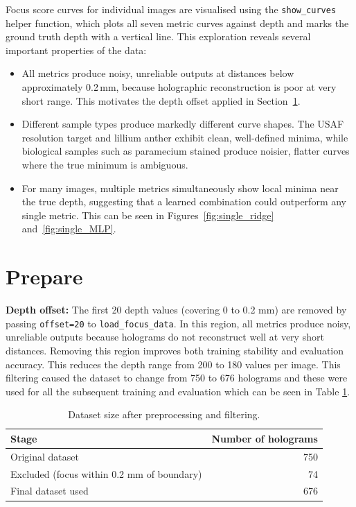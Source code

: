 \documentclass{article}
\begin{document}
Focus score curves for individual images are visualised using the \texttt{show\_curves} helper function,\cite{Helpers} which plots all seven metric curves against depth and marks the ground truth depth with a vertical line. This exploration reveals several important properties of the data:

\begin{itemize}
    \item All metrics produce noisy, unreliable outputs at distances below approximately 0.2\,mm, because holographic reconstruction is poor at very short range. This motivates the depth offset applied in Section~\ref{prepare}.
    \item Different sample types produce markedly different curve shapes. The USAF resolution target and lillium anther exhibit clean, well-defined minima, while biological samples such as paramecium stained produce noisier, flatter curves where the true minimum is ambiguous.
    \item For many images, multiple metrics simultaneously show local minima near the true depth, suggesting that a learned combination could outperform any single metric. This can be seen in Figures~\ref{fig:single_ridge} and~\ref{fig:single_MLP}.
\end{itemize}

\section{Prepare} \label{prepare}

\textbf{Depth offset:} The first 20 depth values (covering 0 to 0.2 mm) are removed by passing \texttt{offset=20} to \texttt{load\_focus\_data}. In this region, all metrics produce noisy, unreliable outputs because holograms do not reconstruct well at very short distances. Removing this region improves both training stability and evaluation accuracy. This reduces the depth range from 200 to 180 values per image. This filtering caused the dataset to change from 750 to 676 holograms and these were used for all the subsequent training and evaluation which can be seen in Table \ref{tab:preprocessing}.

\begin{table}[H]
\centering
\begin{tabular}{lr}
\toprule
Stage & Number of holograms \\
\midrule
Original dataset & 750 \\
Excluded (focus within 0.2 mm of boundary) & 74 \\
Final dataset used & 676 \\
\bottomrule
\end{tabular}
\caption{Dataset size after preprocessing and filtering.}
\label{tab:preprocessing}
\end{table}
\end{document}
